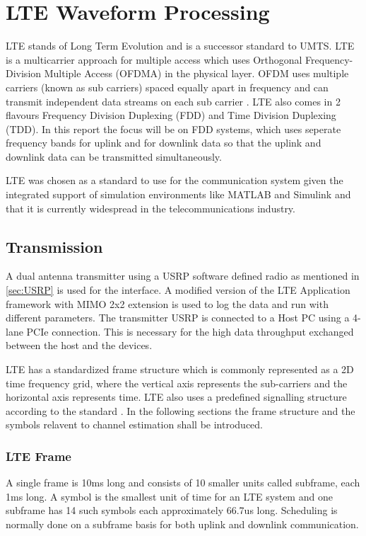 \section{LTE Waveform Processing}\label{sec:LTE Waveform Processing}
LTE stands of Long Term Evolution and is a successor standard to UMTS. LTE is a multicarrier approach for multiple access which uses Orthogonal Frequency-Division Multiple Access (OFDMA) in the physical layer. OFDM uses multiple carriers (known as sub carriers) spaced equally apart in frequency and can transmit independent data streams on each sub carrier \cite{rohling}. LTE also comes in 2 flavours Frequency Division Duplexing (FDD) and Time Division Duplexing (TDD). In this report the focus will be on FDD systems, which uses seperate frequency bands for uplink and for downlink data so that the uplink and downlink data can be transmitted simultaneously.

LTE was chosen as a standard to use for the communication system given the integrated support of simulation environments like MATLAB and Simulink and that it is currently widespread in the telecommunications industry.

\subsection{Transmission} \label{ssec:Transmission}

A dual antenna transmitter using a USRP software defined radio as mentioned in \ref{sec:USRP} is used for the interface. A modified version of the LTE Application framework with MIMO 2x2 extension is used to log the data and run with different parameters. The transmitter USRP is connected to a Host PC using a 4-lane PCIe connection. This is necessary for the high data throughput exchanged between the host and the devices.

LTE has a standardized frame structure which is commonly represented as a 2D time frequency grid, where the vertical axis represents the sub-carriers and the horizontal axis represents time. LTE also uses a predefined signalling structure according to the standard \cite{3gpp36211}. In the following sections the frame structure and the symbols relavent to channel estimation shall be introduced.

\subsubsection{LTE Frame} \label{LTEFrame}

A single frame is 10ms long and consists of 10 smaller units called subframe, each 1ms long. A symbol is the smallest unit of time for an LTE system and one subframe has 14 such symbols each approximately 66.7us long. Scheduling is normally done on a subframe basis for both uplink and downlink communication.

